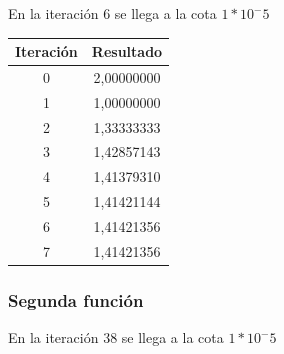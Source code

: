 \documentclass[titlepage,a4paper]{article}
\begin{document}
En la iteración 6 se llega a la cota $1*10^-5$

\begin{center}
    \begin{tabular}{| c | c |}
    \hline
     Iteración & Resultado \\ \hline
        0     & 2,00000000 \\
        1     & 1,00000000 \\
        2     & 1,33333333 \\
        3     & 1,42857143 \\
        4     & 1,41379310 \\
        5     & 1,41421144 \\
        6     & 1,41421356 \\
        7     & 1,41421356 \\
    \hline
    \end{tabular}
\end{center}

\subsubsection{Segunda función}\label{sec:sec2}
En la iteración 38 se llega a la cota $1*10^-5$
\end{document}
